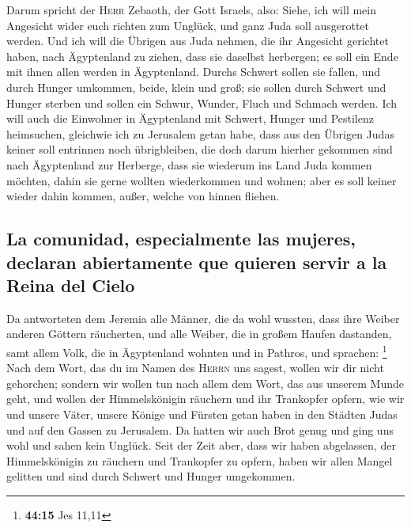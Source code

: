  Darum spricht der \textsc{Herr} Zebaoth, der Gott
Israels, also: Siehe, ich will mein Angesicht wider euch richten zum
Unglück, und ganz Juda soll ausgerottet werden.  Und ich
will die Übrigen aus Juda nehmen, die ihr Angesicht gerichtet haben,
nach Ägyptenland zu ziehen, dass sie daselbst herbergen; es soll ein
Ende mit ihnen allen werden in Ägyptenland. Durchs Schwert sollen sie
fallen, und durch Hunger umkommen, beide, klein und groß; sie sollen
durch Schwert und Hunger sterben und sollen ein Schwur, Wunder, Fluch
und Schmach werden.  Ich will auch die Einwohner in
Ägyptenland mit Schwert, Hunger und Pestilenz heimsuchen, gleichwie ich
zu Jerusalem getan habe,  dass aus den Übrigen Judas
keiner soll entrinnen noch übrigbleiben, die doch darum hierher gekommen
sind nach Ägyptenland zur Herberge, dass sie wiederum ins Land Juda
kommen möchten, dahin sie gerne wollten wiederkommen und wohnen; aber es
soll keiner wieder dahin kommen, außer, welche von hinnen fliehen.

\hypertarget{la-comunidad-especialmente-las-mujeres-declaran-abiertamente-que-quieren-servir-a-la-reina-del-cielo}{%
\subsection{La comunidad, especialmente las mujeres, declaran
abiertamente que quieren servir a la Reina del
Cielo}\label{la-comunidad-especialmente-las-mujeres-declaran-abiertamente-que-quieren-servir-a-la-reina-del-cielo}}

 Da antworteten dem Jeremia alle Männer, die da wohl
wussten, dass ihre Weiber anderen Göttern räucherten, und alle Weiber,
die in großem Haufen dastanden, samt allem Volk, die in Ägyptenland
wohnten und in Pathros, und sprachen: \footnote{\textbf{44:15} Jes 11,11}
 Nach dem Wort, das du im Namen des \textsc{Herrn} uns
sagest, wollen wir dir nicht gehorchen;  sondern wir
wollen tun nach allem dem Wort, das aus unserem Munde geht, und wollen
der Himmelskönigin räuchern und ihr Trankopfer opfern, wie wir und
unsere Väter, unsere Könige und Fürsten getan haben in den Städten Judas
und auf den Gassen zu Jerusalem. Da hatten wir auch Brot genug und ging
uns wohl und sahen kein Unglück.  Seit der Zeit aber,
dass wir haben abgelassen, der Himmelskönigin zu räuchern und Trankopfer
zu opfern, haben wir allen Mangel gelitten und sind durch Schwert und
Hunger umgekommen.

